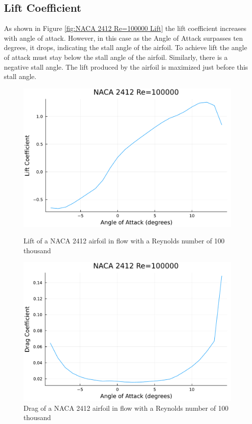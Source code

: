 \documentclass{article}
\begin{document}
\subsection{Lift Coefficient}
As shown in Figure \ref{fig:NACA 2412 Re=100000 Lift} the lift coefficient increases with angle of attack. However, in this case as the Angle of Attack surpasses ten degrees, it drops, indicating the stall angle of the airfoil. To achieve lift the angle of attack must stay below the stall angle of the airfoil. Similarly, there is a negative stall angle. The lift produced by the airfoil is maximized just before this stall angle.
\begin{figure}[h]
    \centering
\begin{minipage}[b]{0.45\textwidth}
\centering
\includegraphics[width=\textwidth]{NACA 2412 Re=100000_Lift_Coefficent_Plot.pdf}
\caption{Lift of a NACA 2412 airfoil in flow with a Reynolds number of 100 thousand}
\label{fig:NACA 2412 Re=100000 Lift}
\end{minipage}
\begin{minipage}[b]{0.45\textwidth}
\centering
\includegraphics[width=\textwidth]{NACA 2412 Re=100000_Drag_Coefficent_Plot.pdf}
\caption{Drag of a NACA 2412 airfoil in flow with a Reynolds number of 100 thousand}
\label{fig:NACA 2412 Re=100000 Drag}
\end{minipage}
\end{figure}
\end{document}
